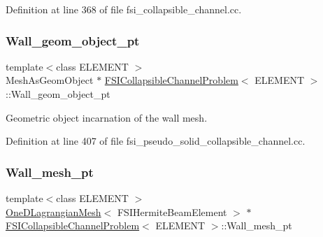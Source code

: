 Definition at line 368 of file fsi\+\_\+collapsible\+\_\+channel.\+cc.

\mbox{\label{classFSICollapsibleChannelProblem_a884256a97060121c507ab9673f0ccef6}} 
\subsubsection{\texorpdfstring{Wall\+\_\+geom\+\_\+object\+\_\+pt}{Wall\_geom\_object\_pt}}
{\footnotesize\ttfamily template$<$class E\+L\+E\+M\+E\+NT $>$ \\
Mesh\+As\+Geom\+Object $\ast$ \hyperlink{classFSICollapsibleChannelProblem}{F\+S\+I\+Collapsible\+Channel\+Problem}$<$ E\+L\+E\+M\+E\+NT $>$\+::Wall\+\_\+geom\+\_\+object\+\_\+pt\hspace{0.3cm}{\ttfamily [private]}}



Geometric object incarnation of the wall mesh. 



Definition at line 407 of file fsi\+\_\+pseudo\+\_\+solid\+\_\+collapsible\+\_\+channel.\+cc.

\mbox{\label{classFSICollapsibleChannelProblem_a2699abcfe8de6b73bbef098e0f0dc1db}} 
\subsubsection{\texorpdfstring{Wall\+\_\+mesh\+\_\+pt}{Wall\_mesh\_pt}}
{\footnotesize\ttfamily template$<$class E\+L\+E\+M\+E\+NT $>$ \\
\hyperlink{classoomph_1_1OneDLagrangianMesh}{One\+D\+Lagrangian\+Mesh}$<$ F\+S\+I\+Hermite\+Beam\+Element $>$ $\ast$ \hyperlink{classFSICollapsibleChannelProblem}{F\+S\+I\+Collapsible\+Channel\+Problem}$<$ E\+L\+E\+M\+E\+NT $>$\+::Wall\+\_\+mesh\+\_\+pt\hspace{0.3cm}{\ttfamily [private]}}



